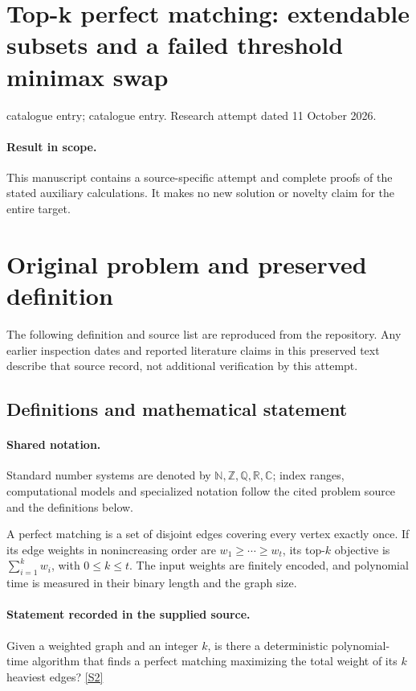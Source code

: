 \documentclass[11pt]{article}
\begin{document}
\section*{Top-k perfect matching: extendable subsets and a failed threshold minimax swap}
\noindent catalogue entry; catalogue entry. Research attempt dated 11 October 2026.
\paragraph{Result in scope.}This manuscript contains a source-specific attempt and complete proofs of the stated auxiliary calculations. It makes no new solution or novelty claim for the entire target.
\section{Original problem and preserved definition}
The following definition and source list are reproduced from the repository. Any earlier inspection dates and reported literature claims in this preserved text describe that source record, not additional verification by this attempt.
\subsection{Definitions and mathematical statement}

\paragraph{Shared notation.}Standard number systems are denoted by $\mathbb N,\mathbb Z,\mathbb Q,\mathbb R,\mathbb C$; index ranges, computational models and specialized notation follow the cited problem source and the definitions below.


A perfect matching is a set of disjoint edges covering every vertex exactly once. If its edge weights in nonincreasing order are $w_1\geq\cdots\geq w_t$, its top-$k$ objective is $\sum_{i=1}^kw_i$, with $0\leq k\leq t$. The input weights are finitely encoded, and polynomial time is measured in their binary length and the graph size.
\paragraph{Statement recorded in the supplied source.}
Given a weighted graph and an integer $k$, is there a deterministic polynomial-time algorithm that finds a perfect matching maximizing the total weight of its $k$ heaviest edges? \href{https://doi.org/10.4171/owr/2021/53}{[S2]}
\end{document}
